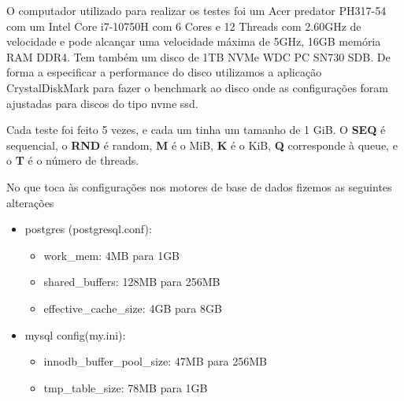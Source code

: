 \documentclass{article}
\begin{document}
O computador utilizado para realizar os testes foi um Acer predator PH317-54 com um Intel Core i7-10750H com 6 Cores e 12 Threads com 2.60GHz de velocidade e pode alcançar uma velocidade máxima de 5GHz, 16GB memória RAM DDR4.
Tem também um disco de 1TB NVMe WDC PC SN730 SDB. De forma a especificar a performance do disco utilizamos a aplicação CrystalDiskMark para fazer o benchmark ao disco onde as configurações foram ajustadas para discos do tipo nvme ssd.
\begin{table}[H]
  \centering
  \fontsize{5pt}{8pt}\selectfont %
  \caption{Testes de Benchmarking}
  \label{tab:BC_Table}
\end{table}

  Cada teste foi feito 5 vezes, e cada um tinha um tamanho de 1 GiB.
  O \textbf{SEQ} é sequencial, o \textbf{RND} é random, \textbf{M} é o MiB, \textbf{K} é o KiB, \textbf{Q} corresponde à queue, e o \textbf{T} é o número de threads.

No que toca às configurações nos motores de base de dados fizemos as seguintes alterações

\begin{itemize}
  \item postgres (postgresql.conf):
  \begin{itemize}
    \item work\_mem: 4MB para 1GB
    \item shared\_buffers: 128MB para 256MB
    \item effective\_cache\_size: 4GB para 8GB

  \end{itemize}
  \item mysql config(my.ini):
  \begin{itemize}
    \item innodb\_buffer\_pool\_size: 47MB para 256MB
    \item tmp\_table\_size: 78MB para 1GB 
  \end{itemize}
\end{itemize}
\clearpage
\end{document}
